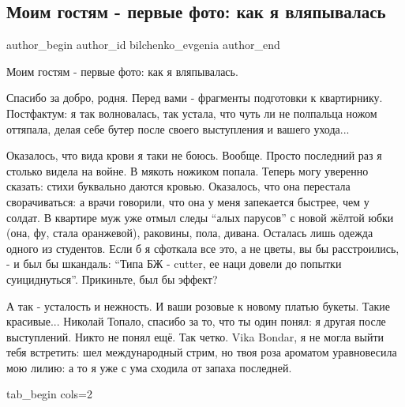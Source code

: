  
 
 
 
 
 
\subsection{Моим гостям - первые фото: как я вляпывалась}
\label{sec:13_06_2021.fb.bilchenko_evgenia.1.foto_moim_gostjam_kvartirnik}
\ifcmt
 author_begin
   author_id bilchenko_evgenia
 author_end
\fi

Моим гостям - первые фото: как я вляпывалась.

Спасибо за добро, родня. Перед вами - фрагменты подготовки к квартирнику.
Постфактум: я так волновалась, так устала, что чуть ли не полпальца ножом
оттяпала, делая себе бутер после своего выступления и вашего ухода...

Оказалось, что вида крови я таки не боюсь. Вообще. Просто последний раз я
столько видела на войне. В мякоть ножиком попала. Теперь могу уверенно сказать:
стихи буквально даются кровью. Оказалось, что она перестала сворачиваться: а
врачи говорили, что она у меня запекается быстрее, чем у солдат. В квартире муж
уже отмыл следы \enquote{алых парусов} с новой жёлтой юбки (она, фу, стала оранжевой),
раковины, пола, дивана. Осталась лишь одежда одного из студентов. Если б я
сфоткала все это, а не цветы, вы бы расстроились, - и был бы шкандаль: \enquote{Типа БЖ
- cutter, ее наци довели до попытки суициднуться}. Прикиньте, был бы эффект? 

А так  - усталость и нежность. И ваши розовые к новому платью букеты. Такие
красивые... Николай Топало, спасибо за то, что ты один понял: я другая после
выступлений. Никто не понял ещё. Так четко. Vika Bondar, я не могла выйти тебя
встретить: шел международный стрим, но твоя роза ароматом уравновесила мою
лилию: а то я уже с ума сходила от запаха последней. 


\ifcmt
  tab_begin cols=2


